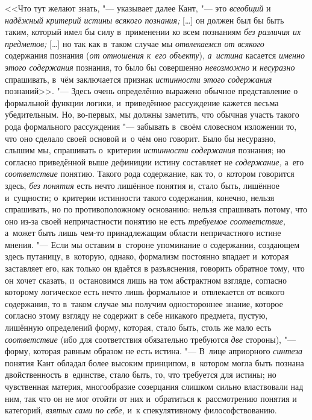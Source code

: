 <<Что тут желают знать, "--- указывает далее Кант,
"--- это {\em всеобщий} и {\em надёжный критерий
истины всякого познания;} [\ldots] он должен был бы быть таким,
который имел бы силу в~применении ко всем познаниям
{\em без различия их предметов;} [\ldots] но так как в~таком случае мы
{\em отвлекаемся от всякого} содержания познания
({\em от отношения к~его объекту}), {\em а~истина} касается
{\em именно этого содержания} познания, то было бы совершенно
{\em невозможно} и {\em несуразно} спрашивать, в~чём заключается признак
{\em истинности этого содержания} познаний>>.
"--- Здесь очень определённо выражено обычное представление о
формальной функции логики, и~приведённое рассуждение кажется весьма
убедительным. Но, во-первых, мы должны заметить, что обычная участь такого
рода формального рассуждения "--- забывать в~своём словесном
изложении то, что оно сделало своей основой и~о чём оно говорит. Было бы
несуразно, слышим мы, спрашивать о~критерии {\em истинности содержания}
познания; но согласно приведённой выше дефиниции истину
составляет не {\em содержание,} а~его {\em соответствие}
понятию. Такого рода содержание, как то, о~котором говорится
здесь, {\em без понятия} есть нечто лишённое понятия и, стало быть,
лишённое и~сущности; о~критерии истинности такого содержания, конечно,
нельзя спрашивать, но по противоположному основанию: нельзя спрашивать
потому, что оно из-за своей непричастности понятию не есть
{\em требуемое соответствие,}
а~может быть лишь чем-то принадлежащим области непричастного
истине мнения. "--- Если мы оставим в~стороне упоминание о
содержании, создающем здесь путаницу, в~которую, однако, формализм
постоянно впадает и~которая заставляет его, как только он вдаётся в
разъяснения, говорить обратное тому, что он хочет сказать, и~остановимся
лишь на том абстрактном взгляде, согласно которому логическое есть нечто
лишь формальное и~отвлекается от всякого содержания, то в~таком случае мы
получим одностороннее знание, которое согласно этому взгляду не содержит в
себе никакого предмета, пустую, лишённую определений форму, которая, стало
быть, столь же мало есть {\em соответствие} (ибо
для соответствия обязательно требуются {\em две} стороны), "---
форму, которая равным образом не есть истина. "---
В~лице априорного {\em синтеза} понятия
Кант обладал более высоким принципом, в~котором могла быть познана
двойственность в~единстве, стало быть, то, что требуется для истины; но
чувственная материя, многообразие созерцания слишком сильно властвовали над
ним, так что он не мог отойти от них и~обратиться к~рассмотрению понятия и
категорий, {\em взятых сами по себе,} и~к спекулятивному философствованию.

